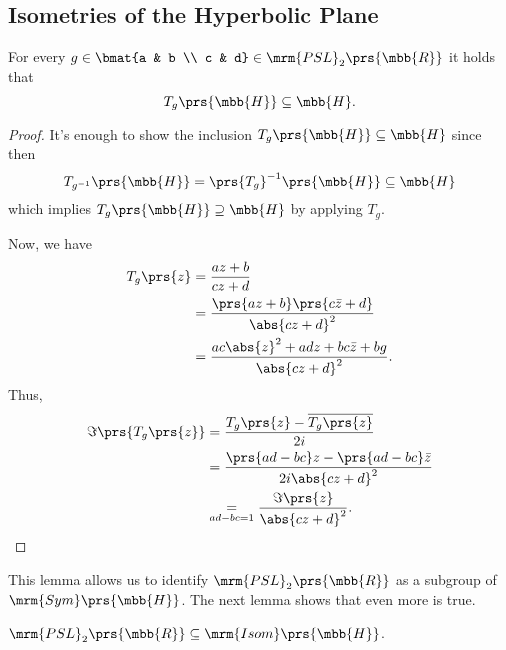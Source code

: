 \documentclass[10pt, twoside]{book}
\begin{document}
\subsection{Isometries of the Hyperbolic Plane}

\begin{lemma}
For every $g \in \bmat{a & b \\ c & d} \in \mrm{PSL}_2\prs{\mbb{R}}$ it holds that
\[T_g\prs{\mbb{H}} \subseteq \mbb{H} \text{.}\]
\end{lemma}

\begin{proof}
It's enough to show the inclusion $T_g\prs{\mbb{H}} \subseteq \mbb{H}$ since then
\[T_{g^{-1}}\prs{\mbb{H}} = \prs{T_g}^{-1} \prs{\mbb{H}} \subseteq \mbb{H}\]
which implies $T_g\prs{\mbb{H}} \supseteq \mbb{H}$ by applying $T_g$.

Now, we have
\begin{align*}
T_g\prs{z} &= \frac{az + b}{cz + d}
\\&=
\frac{\prs{az + b}\prs{c \bar{z} + d}}{\abs{cz + d}^2}
\\&=
\frac{ac \abs{z}^2 + adz + bc \bar{z} + bg}{\abs{cz + d}^2} \text{.}
\end{align*}
Thus,
\begin{align*}
\Im\prs{T_g\prs{z}} &= \frac{T_g\prs{z} - \overline{T_g\prs{z}}}{2 i}
\\&=
\frac{\prs{ad - bc} z - \prs{ad - bc} \bar{z}}{2i \abs{cz + d}^2}
\\&\underset{ad - bc = 1}{=}
\frac{\Im\prs{z}}{\abs{cz + d}^2} \text{.}
\end{align*}

\end{proof}

This lemma allows us to identify $\mrm{PSL}_2\prs{\mbb{R}}$ as a subgroup of $\mrm{Sym}\prs{\mbb{H}}$. The next lemma shows that even more is true.

\begin{lemma}
$\mrm{PSL}_2\prs{\mbb{R}} \subseteq \mrm{Isom}\prs{\mbb{H}}$.
\end{lemma}
\end{document}
